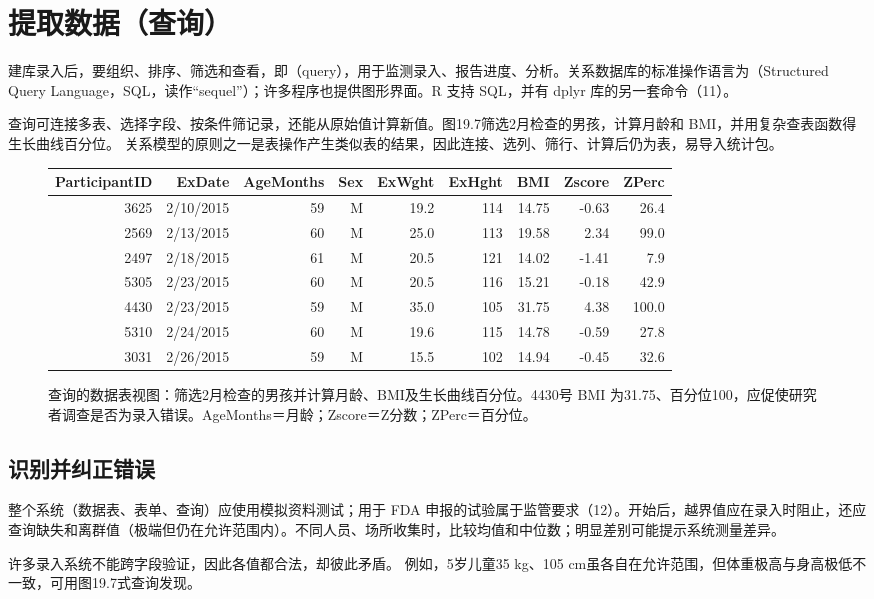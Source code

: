 \section{提取数据（查询）}
建库录入后，要组织、排序、筛选和查看，即（query），用于监测录入、报告进度、分析。关系数据库的标准操作语言为（Structured Query Language，SQL，读作“sequel”）；许多程序也提供图形界面。R 支持 SQL，并有 dplyr 库的另一套命令（11）。

查询可连接多表、选择字段、按条件筛记录，还能从原始值计算新值。图19.7筛选2月检查的男孩，计算月龄和 BMI，并用复杂查表函数得生长曲线百分位。
关系模型的原则之一是表操作产生类似表的结果，因此连接、选列、筛行、计算后仍为表，易导入统计包。

\begin{figure}[htbp]\centering
\begingroup\fontsize{8.5}{12}\selectfont\setlength{\tabcolsep}{4pt}
\begin{tabular}{rrrrrrrrr}\toprule
ParticipantID&ExDate&AgeMonths&Sex&ExWght&ExHght&BMI&Zscore&ZPerc\\\midrule
3625&2/10/2015&59&M&19.2&114&14.75&-0.63&26.4\\
2569&2/13/2015&60&M&25.0&113&19.58&2.34&99.0\\
2497&2/18/2015&61&M&20.5&121&14.02&-1.41&7.9\\
5305&2/23/2015&60&M&20.5&116&15.21&-0.18&42.9\\
\rowcolor{dcrlight}4430&2/23/2015&59&M&35.0&105&31.75&4.38&100.0\\
5310&2/24/2015&60&M&19.6&115&14.78&-0.59&27.8\\
3031&2/26/2015&59&M&15.5&102&14.94&-0.45&32.6\\\bottomrule
\end{tabular}\endgroup
\caption{查询的数据表视图：筛选2月检查的男孩并计算月龄、BMI及生长曲线百分位。4430号 BMI 为31.75、百分位100，应促使研究者调查是否为录入错误。AgeMonths＝月龄；Zscore＝Z分数；ZPerc＝百分位。}
\end{figure}

\subsection{识别并纠正错误}
整个系统（数据表、表单、查询）应使用模拟资料测试；用于 FDA 申报的试验属于监管要求（12）。开始后，越界值应在录入时阻止，还应查询缺失和离群值（极端但仍在允许范围内）。不同人员、场所收集时，比较均值和中位数；明显差别可能提示系统测量差异。

许多录入系统不能跨字段验证，因此各值都合法，却彼此矛盾。
例如，5岁儿童35 kg、105 cm虽各自在允许范围，但体重极高与身高极低不一致，可用图19.7式查询发现。

